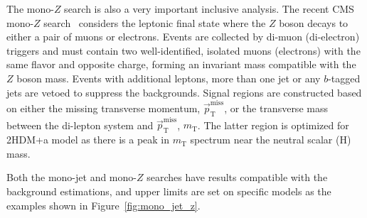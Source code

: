 \documentclass{moriond}
\def\mt{m_{\mathrm{T}}}
\def\ptmiss{\vec{p}_\mathrm{T}^{\mathrm{miss}}}
\begin{document}
The mono-$Z$ search is also a very important inclusive analysis. The recent CMS mono-$Z$
search~\cite{monoz} considers the leptonic final state where the $Z$ boson
decays to either a pair of muons or electrons. Events are collected by di-muon
(di-electron) triggers and must contain two well-identified, isolated muons
(electrons) with the same flavor and opposite charge, forming an invariant mass
compatible with the $Z$ boson mass. Events with additional leptons, more than
one jet or any $b$-tagged jets are vetoed to suppress the backgrounds. Signal
regions are constructed based on either the missing transverse momentum,
$\ptmiss$, or the transverse mass between the di-lepton system and $\ptmiss$,
$\mt$. The latter region is optimized for 2HDM+a model as there is a peak in $\mt$
spectrum near the neutral scalar (H) mass.

Both the mono-jet and mono-$Z$ searches have results compatible with the background estimations, and upper limits are set on specific models as the examples shown in Figure~\ref{fig:mono_jet_z}. 
\end{document}
